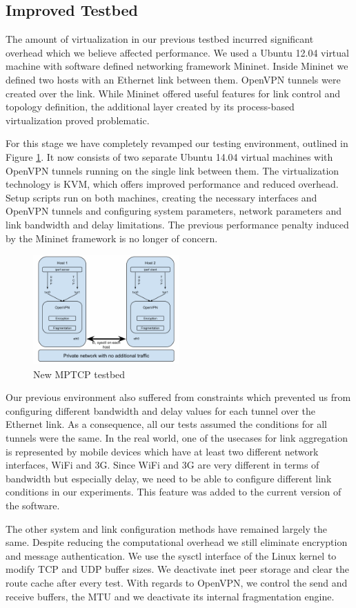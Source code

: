 \subsection{Improved Testbed}
The amount of virtualization in our previous testbed incurred significant overhead which we believe affected performance. We used a Ubuntu 12.04 virtual machine with software defined networking framework Mininet. Inside Mininet we defined two hosts with an Ethernet link between them. OpenVPN tunnels were created over the link. While Mininet offered useful features for link control and topology definition, the additional layer created by its process-based virtualization proved problematic.

For this stage we have completely revamped our testing environment, outlined
in Figure \ref{fig:testbed}. It now
consists of two separate Ubuntu 14.04 virtual machines with OpenVPN tunnels
running on the single link between them. The virtualization technology is KVM,
which offers improved performance and reduced overhead. Setup scripts run on
both machines, creating the necessary interfaces and OpenVPN tunnels and
configuring system parameters, network parameters and link bandwidth and delay
limitations. The previous performance penalty induced by the Mininet
framework is no longer of concern.

\begin{figure}[H]
  \centering
  \includegraphics[width=0.5\textwidth]{img/mptcp-openvpn-bare}
  \caption{New MPTCP testbed}
  \label{fig:testbed}
\end{figure}

Our previous environment also suffered from constraints which prevented us from configuring different bandwidth and delay values for each tunnel over the Ethernet link. As a consequence, all our tests assumed the conditions for all tunnels were the same. In the real world, one of the usecases for link aggregation is represented by mobile devices which have at least two different network interfaces, WiFi and 3G. Since WiFi and 3G are very different in terms of bandwidth but especially delay, we need to be able to configure different link conditions in our experiments. This feature was added to the current version of the software.

The other system and link configuration methods have remained largely the
same. Despite reducing the computational overhead we still eliminate
encryption and message authentication. We use the sysctl interface of the
Linux kernel to modify TCP and UDP buffer sizes. We deactivate inet peer
storage and clear the route cache after every test. With regards to OpenVPN,
we control the send and receive buffers, the MTU and we deactivate its
internal fragmentation engine.
